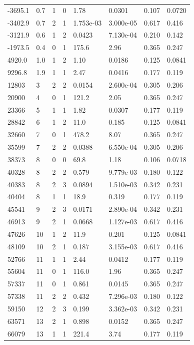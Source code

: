 \documentclass[preview]{standalone}
\begin{document}
{{\begin{tabular}{L{1.2cm}C{1.2cm} C{0.3cm}C{0.5cm} C{1.4cm}C{1.4cm} C{1.4cm}C{1.4cm}}
  -3695.1  &   0.7  & 1     &  0 &  1.78  & 0.0301  & 0.107 &  0.0720   \\ 
  -3402.9  &   0.7  & 2     &  1 &  1.753e-03  & 3.000e-05  & 0.617 &  0.416   \\ 
  -3121.9  &   0.6  & 1     &  2 &  0.0423  & 7.130e-04  & 0.210 &  0.142   \\ 
  -1973.5  &   0.4  & 0     &  1 &  175.6  & 2.96  & 0.365 &  0.247   \\ 
  4920.0  &   1.0  & 1     &  2 &  1.10  & 0.0186  & 0.125 &  0.0841   \\ 
  9296.8  &   1.9  & 1     &  1 &  2.47  & 0.0416  & 0.177 &  0.119   \\ 
  12803  &     3  & 2     &  2 &  0.0154  & 2.600e-04  & 0.305 &  0.206   \\ 
  20900  &     4  & 0     &  1 &  121.2  & 2.05  & 0.365 &  0.247   \\ 
  23366  &     5  & 1     &  1 &  1.82  & 0.0307  & 0.177 &  0.119   \\ 
  28842  &     6  & 1     &  2 &  11.0  & 0.185  & 0.125 &  0.0841   \\ 
  32660  &     7  & 0     &  1 &  478.2  & 8.07  & 0.365 &  0.247   \\ 
  35599  &     7  & 2     &  2 &  0.0388  & 6.550e-04  & 0.305 &  0.206   \\ 
  38373  &     8  & 0     &  0 &  69.8  & 1.18  & 0.106 &  0.0718   \\ 
  40328  &     8  & 2     &  2 &  0.579  & 9.779e-03  & 0.180 &  0.122   \\ 
  40383  &     8  & 2     &  3 &  0.0894  & 1.510e-03  & 0.342 &  0.231   \\ 
  40404  &     8  & 1     &  1 &  18.9  & 0.319  & 0.177 &  0.119   \\ 
  45541  &     9  & 2     &  3 &  0.0171  & 2.890e-04  & 0.342 &  0.231   \\ 
  46913  &     9  & 2     &  1 &  0.0668  & 1.127e-03  & 0.617 &  0.416   \\ 
  47626  &    10  & 1     &  2 &  11.9  & 0.201  & 0.125 &  0.0841   \\ 
  48109  &    10  & 2     &  1 &  0.187  & 3.155e-03  & 0.617 &  0.416   \\ 
  52766  &    11  & 1     &  1 &  2.44  & 0.0412  & 0.177 &  0.119   \\ 
  55604  &    11  & 0     &  1 &  116.0  & 1.96  & 0.365 &  0.247   \\ 
  57337  &    11  & 0     &  1 &  0.861  & 0.0145  & 0.365 &  0.247   \\ 
  57338  &    11  & 2     &  2 &  0.432  & 7.296e-03  & 0.180 &  0.122   \\ 
  59150  &    12  & 2     &  3 &  0.199  & 3.362e-03  & 0.342 &  0.231   \\ 
  63571  &    13  & 2     &  1 &  0.898  & 0.0152  & 0.365 &  0.247   \\ 
  66079  &    13  & 1     &  1 &  221.4  & 3.74  & 0.177 &  0.119   \\ 
\hline 
\end{tabular} 

}}
\end{document}
